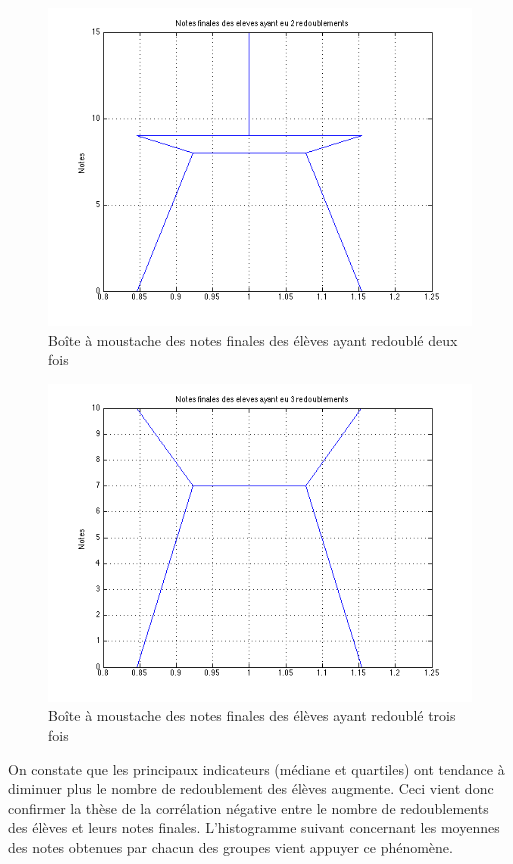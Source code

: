 \documentclass[11pt]{article}
\begin{document}
\begin{figure}[h]
\includegraphics[scale=0.45]{Images/fig27.png}
\caption{Boîte à moustache des notes finales des élèves ayant redoublé deux fois}
\end{figure}\FloatBarrier

\begin{figure}[h]
\centering
\includegraphics[scale=0.45]{Images/fig28.png}
\caption{Boîte à moustache des notes finales des élèves ayant redoublé trois fois}
\end{figure}



On constate que les principaux indicateurs (médiane et quartiles) ont tendance à diminuer plus le nombre de redoublement des élèves augmente. Ceci vient donc confirmer la thèse de la corrélation négative entre le nombre de redoublements des élèves et leurs notes finales. L'histogramme suivant concernant les moyennes des notes obtenues par chacun des groupes vient appuyer ce phénomène.
\end{document}
